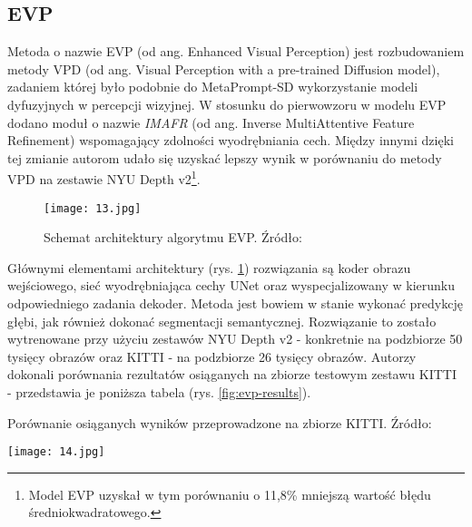 \subsection{EVP}
Metoda o nazwie EVP \cite{lavreniuk2023} (od ang. Enhanced Visual Perception) jest rozbudowaniem metody VPD \cite{zhao2023} (od ang. Visual Perception with a pre-trained Diffusion model), zadaniem której było podobnie do MetaPrompt-SD wykorzystanie modeli dyfuzyjnych w percepcji wizyjnej. W stosunku do pierwowzoru w modelu EVP dodano moduł o nazwie \textit{IMAFR} (od ang. Inverse MultiAttentive Feature Refinement) wspomagający zdolności wyodrębniania cech. Między innymi dzięki tej zmianie autorom udało się uzyskać lepszy wynik w porównaniu do metody VPD na zestawie NYU Depth v2\footnote{Model EVP uzyskał w tym porównaniu o 11,8\% mniejszą wartość błędu średniokwadratowego.}.
\begin{figure}[H]
    \centering
    \texttt{[image: 13.jpg]}
    \caption{Schemat architektury algorytmu EVP. Źródło: \cite{lavreniuk2023}}
    \label{fig:evp-schema}
\end{figure}
Głównymi elementami architektury (rys. \ref{fig:evp-schema}) rozwiązania są koder obrazu wejściowego, sieć wyodrębniająca cechy UNet oraz wyspecjalizowany w kierunku odpowiedniego zadania dekoder. Metoda jest bowiem w stanie wykonać predykcję głębi, jak również dokonać segmentacji semantycznej. Rozwiązanie to zostało wytrenowane przy użyciu zestawów NYU Depth v2 - konkretnie na podzbiorze 50 tysięcy obrazów oraz KITTI - na podzbiorze 26 tysięcy obrazów. Autorzy dokonali porównania rezultatów osiąganych na zbiorze testowym zestawu KITTI - przedstawia je poniższa tabela (rys. \ref{fig:evp-results}).
\begin{table}[H]
    \centering
    \caption{Porównanie osiąganych wyników przeprowadzone na zbiorze KITTI. Źródło: \cite{lavreniuk2023}}
    \texttt{[image: 14.jpg]}
    \label{fig:evp-results}
\end{table}

